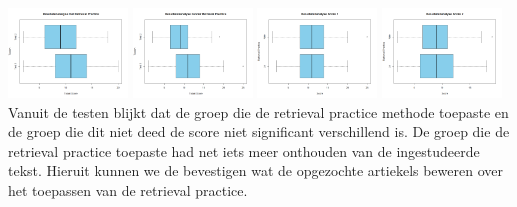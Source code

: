 \documentclass{hogent-article}
\begin{document}
	\includegraphics[width=120px]{Rplot_MetRetrievalPractice}
	\includegraphics[width=120px]{Rplot_ZonderRetrievalPractice}
	\includegraphics[width=120px]{Rplot_RetrievalPractice_Score1}
	\includegraphics[width=120px]{Rplot_RetrievalPractice_Score2}
	Vanuit de testen blijkt dat de groep die de retrieval practice methode toepaste en de groep die dit niet deed de score niet significant verschillend is. De groep die de retrieval practice toepaste had net iets meer onthouden van de ingestudeerde tekst. Hieruit kunnen we de bevestigen wat de opgezochte artiekels beweren over het toepassen van de retrieval practice.
	
\end{document}
